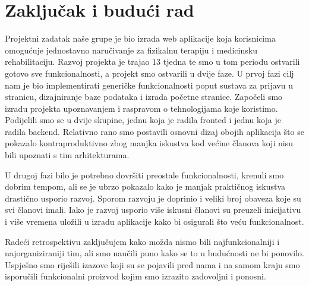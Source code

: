 \chapter{Zaključak i budući rad}
		
		Projektni zadatak naše grupe je bio izrada  web aplikacije koja korisnicima omogućuje jednostavno naručivanje za fizikalnu terapiju i medicinsku rehabilitaciju. Razvoj projekta je trajao 13 tjedna te smo u tom periodu ostvarili gotovo sve funkcionalnosti, a projekt smo ostvarili u dvije faze. U prvoj fazi cilj nam je bio implementirati generičke funkcionalnosti poput sustava za prijavu u stranicu, dizajniranje baze podataka i izrada početne stranice.
		Započeli smo izradu projekta upoznavanjem i raspravom o tehnologijama koje koristimo. Podijelili smo se u dvije skupine, jednu koja je radila fronted i jednu koja
		je radila backend. Relativno rano smo postavili osnovni dizaj obojih aplikacija što se pokazalo kontraproduktivno zbog manjka iskustva kod većine članova koji nisu bili upoznati s tim arhitekturama.
		
		U drugoj fazi bilo je potrebno dovršiti preostale funkcionalnosti, krenuli smo dobrim tempom, ali se je ubrzo pokazalo kako je manjak praktičnog iskustva drastično usporio razvoj. Sporom razvoju je doprinio i veliki broj obaveza koje su svi članovi imali. Iako je razvoj usporio više iskusni članovi su preuzeli inicijativu i više vremena uložili u izradu aplikacije kako bi osigurali što veću funkcionalnost.


Radeći retrospektivu zaključujem kako možda nismo bili najfunkcionalniji i
najorganiziraniji tim, ali smo naučili puno kako se to u budućnosti ne bi ponovilo.
Uspješno smo riješili izazove koji su se pojavili pred nama i na samom kraju smo
isporučili funkcionalni proizvod kojim smo izrazito zadovoljni i ponosni.
\eject 
		\eject 